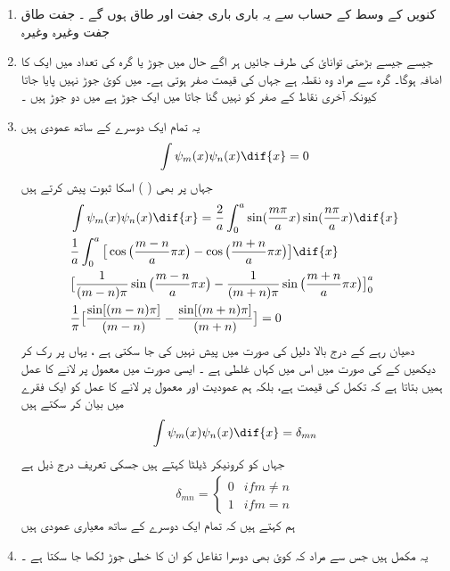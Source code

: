 \begin{enumerate}
\item
 کنویں کے وسط کے حساب سے یہ باری باری جفت اور طاق ہوں گے ۔       جفت       طاق   جفت وغیرہ وغیرہ
\item
جیسے جیسے بڑھتی توانائ کی طرف جائیں   ہر اگے حال میں جوڑ یا گرہ کی تعداد میں ایک کا اضافہ ہوگا۔ گرہ سے مراد وہ نقطہ ہے جہاں   کی قیمت صفر ہوتی ہے۔  میں کوئ جوڑ نہیں پایا جاتا کیونکہ آخری نقاط کے صفر کو نہیں گنا جاتا   میں ایک جوڑ ہے  میں دو جوڑ ہیں ۔
\item
 یہ تمام ایک دوسرے کے ساتھ عمودی ہیں 
\begin{align}
\int\psi_{m}(x)\psi_{n}(x)\dif{x}=0
\end{align}
جہاں پر بھی (  ) اسکا ثبوت پیش کرتے ہیں 
\begin{align}
&\int\psi_{m}(x)\psi_{n}(x)\dif{x}=\frac{2}{a}\int_{0}^{a}\sin(\frac{m\pi}{a}x)\sin(\frac{n\pi}{a}x)\dif{x}\\
&\frac{1}{a}\int_{0}^{a}\big[\cos\big(\frac{m-n}{a}\pi x\big)-\cos\big(\frac{m+n}{a}\pi x\big)\big]\dif{x}\\
&\big[\frac{1}{(m-n)\pi}\sin\big(\frac{m-n}{a}\pi x\big)-\frac{1}{(m+n)\pi}\sin\big(\frac{m+n}{a}\pi x\big)\big]_{0}^{a}\\
&\frac{1}{\pi}\big[\frac{\sin[(m-n)\pi]}{(m-n)}-\frac{\sin[(m+n)\pi]}{(m+n)}\big]=0
\end{align} 
دھیان رہے کے درج بالا دلیل             کی صورت میں پیش نہیں کی جا سکتی ہے ، یہاں پر رک کر دیکھیں کے    کی صورت میں اس میں کہاں غلطی ہے ۔ ایسی صورت میں معمول پر لانے کا عمل ہمیں بتاتا ہے کہ تکمل کی قیمت   ہے، بلکہ ہم عمودیت اور معمول پر لانے کا عمل کو ایک فقرے میں بیان کر سکتے ہیں 
\begin{align}
\int\psi_{m}(x)\psi_{n}(x)\dif{x}=\delta_{mn}
\end{align}
جہاں    کو کرونیکر ڈیلٹا کہتے ہیں جسکی تعریف درج ذیل ہے
\begin{align}
\delta_{mn}=
\begin{cases}
0& if m\neq n\\
1 & if m=n
\end{cases}
\end{align} 
ہم کہتے ہیں کہ تمام    ایک دوسرے کے ساتھ معیاری عمودی ہیں 
\item
 یہ مکمل ہیں جس سے مراد کہ کوئ بھی دوسرا تفاعل        کو ان کا خطی جوڑ لکھا جا سکتا ہے ۔ 
\begin{align}

\end{align}
\end{enumerate}
